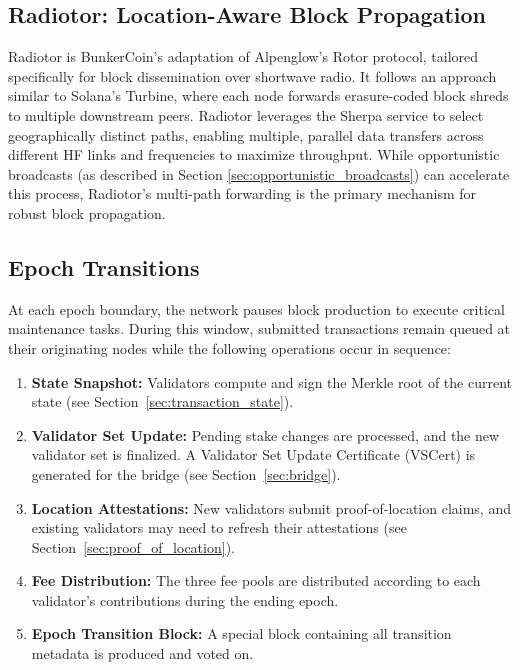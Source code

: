 \documentclass{article}
\begin{document}
\subsection{Radiotor: Location-Aware Block Propagation}

Radiotor is BunkerCoin's adaptation of Alpenglow's Rotor protocol, tailored specifically for block dissemination over shortwave radio. It follows an approach similar to Solana's Turbine, where each node forwards erasure-coded block shreds to multiple downstream peers. Radiotor leverages the Sherpa service to select geographically distinct paths, enabling multiple, parallel data transfers across different HF links and frequencies to maximize throughput. While opportunistic broadcasts (as described in Section \ref{sec:opportunistic_broadcasts}) can accelerate this process, Radiotor's multi-path forwarding is the primary mechanism for robust block propagation.

\subsection{Epoch Transitions}
\label{sec:epoch_transitions}

At each epoch boundary, the network pauses block production to execute critical maintenance tasks. During this window, submitted transactions remain queued at their originating nodes while the following operations occur in sequence:

\begin{enumerate}
    \item \textbf{State Snapshot:} Validators compute and sign the Merkle root of the current state (see Section~\ref{sec:transaction_state}).
    \item \textbf{Validator Set Update:} Pending stake changes are processed, and the new validator set is finalized. A Validator Set Update Certificate (VSCert) is generated for the bridge (see Section~\ref{sec:bridge}).
    \item \textbf{Location Attestations:} New validators submit proof-of-location claims, and existing validators may need to refresh their attestations (see Section~\ref{sec:proof_of_location}).
    \item \textbf{Fee Distribution:} The three fee pools are distributed according to each validator's contributions during the ending epoch.
    \item \textbf{Epoch Transition Block:} A special block containing all transition metadata is produced and voted on.
\end{enumerate}
\end{document}
